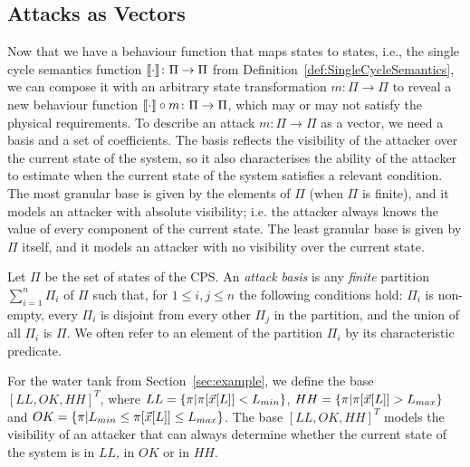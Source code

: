 {\subsection{Attacks as Vectors} 
Now that we have a behaviour function that maps states to states, i.e., the single cycle semantics function ${{{\llbracket\cdot\rrbracket}}}\colon\Pi\rightarrow\Pi$ from Definition~\ref{def:SingleCycleSemantics}, we can compose it with an arbitrary state transformation $m\colon \Pi\rightarrow\Pi$ to reveal a new behaviour function ${{{\llbracket\cdot\rrbracket}}}\circ m\colon\Pi\rightarrow\Pi$, which may or may not satisfy the physical requirements. 
To describe an attack $m\colon \Pi\rightarrow \Pi$ as a vector, we need a basis and a set of coefficients. The basis reflects the visibility of the attacker over the current state of the system, so it also characterises the ability of the attacker to estimate when the current state of the system satisfies a relevant condition. The most granular base is given by the elements of $\Pi$ (when $\Pi$ is finite), and it models an attacker with absolute visibility; i.e. the attacker always knows the value of every component of the current state. The least granular base is given by $\Pi$ itself, and it models an attacker with no visibility over the current state.
\begin{definition}
  \label{def:AttackBasis}
Let $\Pi$ be the set of states of the CPS. An \emph{attack basis} is any \emph{finite} partition $\sum_{i=1}^n \Pi_i$ of $\Pi$ such that, for $1\leq i,j \leq n$ the following conditions hold: $\Pi_i$ is non-empty, every $\Pi_i$ is disjoint from every other $\Pi_j$ in the partition, and the union of all $\Pi_i$ is $\Pi$. We often refer to an element of the partition $\Pi_i$ by its characteristic predicate.
\end{definition}
\begin{example}
  \label{ex:AttackBasis}
  For the water tank from Section~\ref{sec:example}, we define the base $[LL, OK, HH]^T$, where ${LL}=\left\{\pi| \pi[\vec{x}[L]]<L_{min}\right\}$, ${HH}=\left\{\pi| \pi[\vec{x}[L]]>L_{max}\right\}$ and ${OK}=\left\{\pi|L_{min} \leq \pi[\vec{x}[L]]\leq L_{max}\right\}$. The base $[LL, OK, HH]^T$ models the visibility of an attacker that can always determine whether the current state of the system is in $LL$, in $OK$ or in $HH$.  %
\end{example}

}
